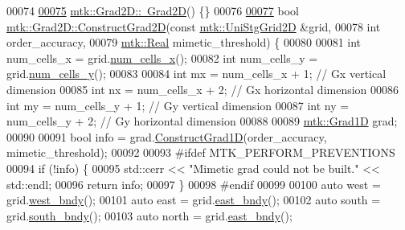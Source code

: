 \begin{DoxyCode}
00074 
\hypertarget{mtk__grad__2d_8cc_source_l00075}{}\hyperlink{classmtk_1_1Grad2D_ae6a071b24422d057c41346e80be96cb3}{00075} \hyperlink{classmtk_1_1Grad2D_ae6a071b24422d057c41346e80be96cb3}{mtk::Grad2D::~Grad2D}() \{\}
00076 
\hypertarget{mtk__grad__2d_8cc_source_l00077}{}\hyperlink{classmtk_1_1Grad2D_a9771be954c59880e3d83f4d645378c00}{00077} \textcolor{keywordtype}{bool} \hyperlink{classmtk_1_1Grad2D_a9771be954c59880e3d83f4d645378c00}{mtk::Grad2D::ConstructGrad2D}(\textcolor{keyword}{const} 
      \hyperlink{classmtk_1_1UniStgGrid2D}{mtk::UniStgGrid2D} &grid,
00078                                   \textcolor{keywordtype}{int} order\_accuracy,
00079                                   \hyperlink{group__c01-roots_gac080bbbf5cbb5502c9f00405f894857d}{mtk::Real} mimetic\_threshold) \{
00080 
00081   \textcolor{keywordtype}{int} num\_cells\_x = grid.\hyperlink{classmtk_1_1UniStgGrid2D_a2d182866a398aba8e4829590e85bf939}{num\_cells\_x}();
00082   \textcolor{keywordtype}{int} num\_cells\_y = grid.\hyperlink{classmtk_1_1UniStgGrid2D_aed05a801cc9a76dba0ff203cea58a61a}{num\_cells\_y}();
00083 
00084   \textcolor{keywordtype}{int} mx = num\_cells\_x + 1;  \textcolor{comment}{// Gx vertical dimension}
00085   \textcolor{keywordtype}{int} nx = num\_cells\_x + 2;  \textcolor{comment}{// Gx horizontal dimension}
00086   \textcolor{keywordtype}{int} my = num\_cells\_y + 1;  \textcolor{comment}{// Gy vertical dimension}
00087   \textcolor{keywordtype}{int} ny = num\_cells\_y + 2;  \textcolor{comment}{// Gy horizontal dimension}
00088 
00089   \hyperlink{classmtk_1_1Grad1D}{mtk::Grad1D} grad;
00090 
00091   \textcolor{keywordtype}{bool} info = grad.\hyperlink{classmtk_1_1Grad1D_a74ef5245cfae6fd158bd7f563a0c2e52}{ConstructGrad1D}(order\_accuracy, mimetic\_threshold);
00092 
00093 \textcolor{preprocessor}{  #ifdef MTK\_PERFORM\_PREVENTIONS}
00094   \textcolor{keywordflow}{if} (!info) \{
00095     std::cerr << \textcolor{stringliteral}{"Mimetic grad could not be built."} << std::endl;
00096     \textcolor{keywordflow}{return} info;
00097   \}
00098 \textcolor{preprocessor}{  #endif}
00099 
00100   \textcolor{keyword}{auto} west = grid.\hyperlink{classmtk_1_1UniStgGrid2D_af2b1712387ded85edaf2b64617d3fc13}{west\_bndy}();
00101   \textcolor{keyword}{auto} east = grid.\hyperlink{classmtk_1_1UniStgGrid2D_a03f689eb29a6369b82ce1207c655d5ff}{east\_bndy}();
00102   \textcolor{keyword}{auto} south = grid.\hyperlink{classmtk_1_1UniStgGrid2D_a1442eaf219f099d0ebf46a170fdebf92}{south\_bndy}();
00103   \textcolor{keyword}{auto} north = grid.\hyperlink{classmtk_1_1UniStgGrid2D_a03f689eb29a6369b82ce1207c655d5ff}{east\_bndy}();

\end{DoxyCode}
